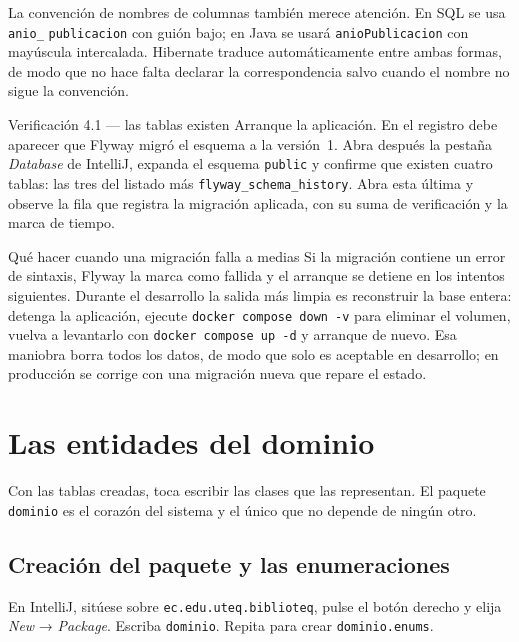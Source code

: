 \documentclass[11pt,a4paper,openany]{book}
\begin{document}
La convención de nombres de columnas también merece atención. En SQL se usa \texttt{anio\_} \texttt{publicacion} con guión bajo; en Java se usará \texttt{anioPublicacion} con mayúscula intercalada. Hibernate traduce automáticamente entre ambas formas, de modo que no hace falta declarar la correspondencia salvo cuando el nombre no sigue la convención.

\begin{cajaejercicio}{Verificación 4.1 --- las tablas existen}
	Arranque la aplicación. En el registro debe aparecer que Flyway migró el esquema a la versión~1. Abra después la pestaña \emph{Database} de IntelliJ, expanda el esquema \texttt{public} y confirme que existen cuatro tablas: las tres del listado más \texttt{flyway\_schema\_history}. Abra esta última y observe la fila que registra la migración aplicada, con su suma de verificación y la marca de tiempo.
\end{cajaejercicio}

\begin{cajaadvertencia}{Qué hacer cuando una migración falla a medias}
	Si la migración contiene un error de sintaxis, Flyway la marca como fallida y el arranque se detiene en los intentos siguientes. Durante el desarrollo la salida más limpia es reconstruir la base entera: detenga la aplicación, ejecute \texttt{docker compose down -v} para eliminar el volumen, vuelva a levantarlo con \texttt{docker compose up -d} y arranque de nuevo. Esa maniobra borra todos los datos, de modo que solo es aceptable en desarrollo; en producción se corrige con una migración nueva que repare el estado.
\end{cajaadvertencia}

\section{Las entidades del dominio}
\label{sec:entidades}

Con las tablas creadas, toca escribir las clases que las representan. El paquete \texttt{dominio} es el corazón del sistema y el único que no depende de ningún otro.

\subsection{Creación del paquete y las enumeraciones}
\label{sec:enums}

En IntelliJ, sitúese sobre \texttt{ec.edu.uteq.biblioteq}, pulse el botón derecho y elija \emph{New} → \emph{Package}. Escriba \texttt{dominio}. Repita para crear \texttt{dominio.enums}.
\end{document}
